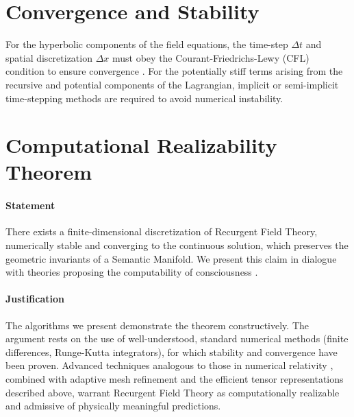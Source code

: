 
\section{Convergence and Stability}
\label{17.5:convergence_and_stability}

For the hyperbolic components of the field equations, the time-step \(\Delta t\) and spatial discretization \(\Delta x\) must obey the Courant-Friedrichs-Lewy (CFL) condition to ensure convergence \autocite{CourantFriedrichsLewy1928}. For the potentially stiff terms arising from the recursive and potential components of the Lagrangian, implicit or semi-implicit time-stepping methods are required to avoid numerical instability.



\section{Computational Realizability Theorem}
\label{17.6:computational_realizability_theorem}

\paragraph{Statement}

There exists a finite-dimensional discretization of Recurgent Field Theory, numerically stable and converging to the continuous solution, which preserves the geometric invariants of a Semantic Manifold. We present this claim in dialogue with theories proposing the computability of consciousness \autocite{KochConsciousness2019}.

\paragraph{Justification}
The algorithms we present demonstrate the theorem constructively. The argument rests on the use of well-understood, standard numerical methods (finite differences, Runge-Kutta integrators), for which stability and convergence have been proven. Advanced techniques analogous to those in numerical relativity \autocite{BaumgarteShapiro2010}, combined with adaptive mesh refinement and the efficient tensor representations described above, warrant Recurgent Field Theory as computationally realizable and admissive of physically meaningful predictions.

